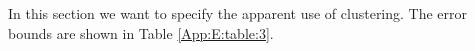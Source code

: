 In this section we want to specify the apparent use of clustering. The error bounds are shown in Table \ref{App:E:table:3}.


 
